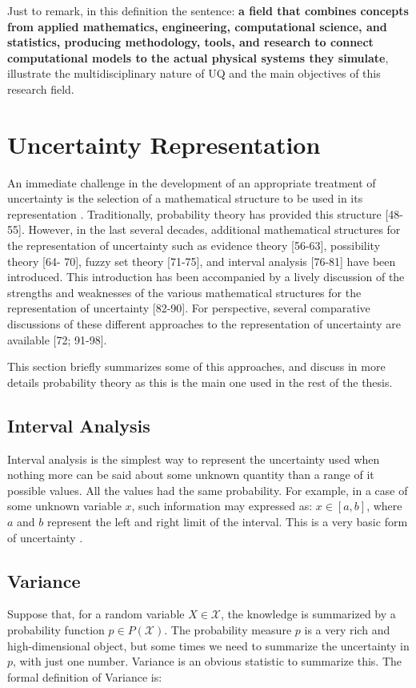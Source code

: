 Just to remark, in this definition the sentence: \textbf{a field that combines concepts from applied mathematics, engineering, computational science, and statistics, producing methodology, tools, and research to connect computational models to the actual physical systems they simulate}, illustrate the multidisciplinary nature of UQ and the main objectives of this research field.


\section{Uncertainty Representation}\label{sec:uncertainty_representation}

An immediate challenge in the development of an appropriate treatment of uncertainty is the selection of a mathematical structure to be used in its representation \cite{Helton2010}. Traditionally, probability theory has provided this structure [48-55]. However, in the last several decades, additional mathematical structures for the representation of uncertainty such as evidence theory [56-63], possibility theory [64- 70], fuzzy set theory [71-75], and interval analysis [76-81] have been introduced.
This introduction has been accompanied by a lively discussion of the strengths and weaknesses of the various mathematical structures for the representation of uncertainty [82-90]. For perspective, several comparative discussions of these different approaches to the representation of uncertainty are available [72; 91-98].


This section briefly summarizes some of this approaches, and discuss in more details probability theory as this is the main one used in the rest of the thesis.

\subsection{Interval Analysis}
Interval analysis is the simplest way to represent the uncertainty used when nothing more can be said about some unknown quantity than a range of it possible values. All the values had the same probability. For example, in a case of some unknown variable $x$, such information may expressed as: $x \in [a, b]$, where $a$ and $b$ represent the left and right limit of the interval. This is a very basic form of uncertainty \cite{Sullivan2015}.

\subsection{Variance}
Suppose that, for a random variable $X \in \mathcal{X}$, the knowledge is summarized by a probability function $p \in P(\mathcal{X})$. The probability measure $p$ is a very rich and high-dimensional object, but some times we need to summarize the uncertainty in $p$, with just one number. Variance is an obvious statistic to summarize this. The formal definition of Variance is:

